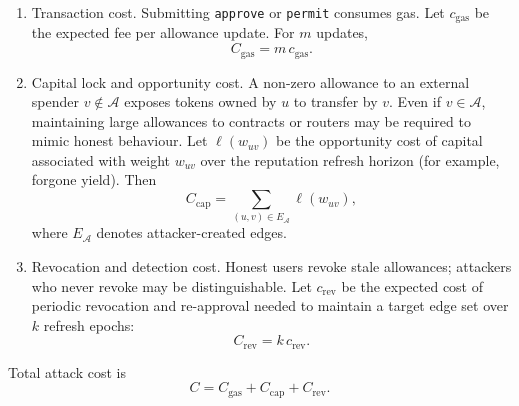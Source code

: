 \begin{enumerate}
\item Transaction cost. Submitting \texttt{approve} or \texttt{permit} consumes gas. Let $c_{\mathrm{gas}}$ be the expected fee per allowance update. For $m$ updates,
\begin{equation}
C_{\mathrm{gas}} = m\, c_{\mathrm{gas}}.
\end{equation}

\item Capital lock and opportunity cost. A non-zero allowance to an external spender $v\notin\mathcal{A}$ exposes tokens owned by $u$ to transfer by $v$. Even if $v\in\mathcal{A}$, maintaining large allowances to contracts or routers may be required to mimic honest behaviour. Let $\ell(w_{uv})$ be the opportunity cost of capital associated with weight $w_{uv}$ over the reputation refresh horizon (for example, forgone yield). Then
\begin{equation}
C_{\mathrm{cap}} = \sum_{(u,v)\in E_{\mathcal{A}}} \ell(w_{uv}),
\end{equation}
where $E_{\mathcal{A}}$ denotes attacker-created edges.

\item Revocation and detection cost. Honest users revoke stale allowances; attackers who never revoke may be distinguishable. Let $c_{\mathrm{rev}}$ be the expected cost of periodic revocation and re-approval needed to maintain a target edge set over $k$ refresh epochs:
\begin{equation}
C_{\mathrm{rev}} = k\, c_{\mathrm{rev}}.
\end{equation}
\end{enumerate}

Total attack cost is
\begin{equation}
\label{eq:total-cost}
C = C_{\mathrm{gas}} + C_{\mathrm{cap}} + C_{\mathrm{rev}}.
\end{equation}


